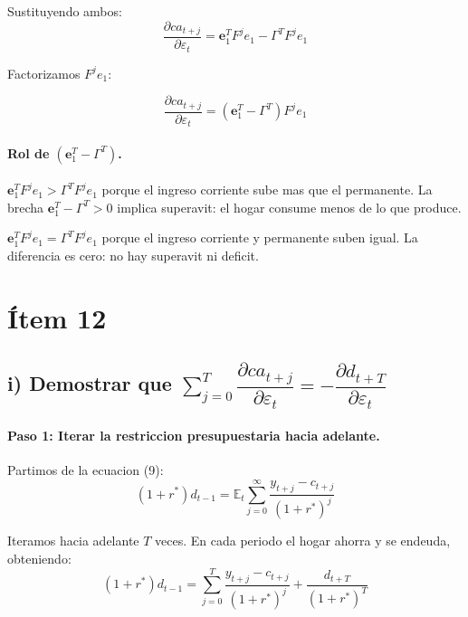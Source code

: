 Sustituyendo ambos:
\[
    \frac{\partial ca_{t+j}}{\partial \varepsilon_t}
    = \mathbf{e}_1^T F^j e_1 - \Gamma^T F^j e_1
\]

Factorizamos $F^j e_1$:

\begin{resultado}
\[
    \frac{\partial ca_{t+j}}{\partial \varepsilon_t} = (\mathbf{e}_1^T - \Gamma^T) F^j e_1
\]
\end{resultado}

\paragraph{Rol de $(\mathbf{e}_1^T - \Gamma^T)$.}

\begin{condicion}
$\mathbf{e}_1^T F^j e_1 > \Gamma^T F^j e_1$ porque el ingreso corriente sube mas que el permanente. La brecha $\mathbf{e}_1^T - \Gamma^T > 0$ implica superavit: el hogar consume menos de lo que produce.
\end{condicion}

\begin{condicion}
$\mathbf{e}_1^T F^j e_1 = \Gamma^T F^j e_1$ porque el ingreso corriente y permanente suben igual. La diferencia es cero: no hay superavit ni deficit.
\end{condicion}

\section*{Ítem 12}

\subsection*{i) Demostrar que $\displaystyle\sum_{j=0}^{T} \dfrac{\partial ca_{t+j}}{\partial \varepsilon_t} = -\dfrac{\partial d_{t+T}}{\partial \varepsilon_t}$}

\paragraph{Paso 1: Iterar la restriccion presupuestaria hacia adelante.}

Partimos de la ecuacion (9):
\[
    (1+r^*) d_{t-1} = \mathbb{E}_t \sum_{j=0}^{\infty} \frac{y_{t+j} - c_{t+j}}{(1+r^*)^j}
\]

Iteramos hacia adelante $T$ veces. En cada periodo el hogar ahorra y se endeuda, obteniendo:
\[
    (1+r^*) d_{t-1} = \sum_{j=0}^{T} \frac{y_{t+j} - c_{t+j}}{(1+r^*)^j} + \frac{d_{t+T}}{(1+r^*)^T}
\]

